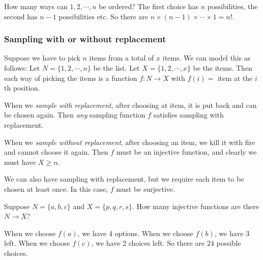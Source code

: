 \documentclass[a4paper]{article}
\begin{document}
\begin{eg}
  How many ways can $1, 2, \cdots, n$ be ordered? The first choice has $n$ possibilities, the second has $n - 1$ possibilities etc. So there are $n\times (n - 1)\times\cdots \times 1 = n!$.
\end{eg}

\subsubsection*{Sampling with or without replacement}
Suppose we have to pick $n$ items from a total of $x$ items. We can model this as follows: Let $N = \{1, 2, \cdots, n\}$ be the list. Let $X = \{1, 2, \cdots, x\}$ be the items. Then each way of picking the items is a function $f: N\to X$ with $f(i) =$ item at the $i$th position.

\begin{defi}
  When we \emph{sample with replacement}, after choosing at item, it is put back and can be chosen again. Then \emph{any} sampling function $f$ satisfies sampling with replacement.
\end{defi}

\begin{defi}
  When we \emph{sample without replacement}, after choosing an item, we kill it with fire and cannot choose it again. Then $f$ must be an injective function, and clearly we must have $X \geq n$.
\end{defi}

We can also have sampling with replacement, but we require each item to be chosen at least once. In this case, $f$ must be surjective.

\begin{eg}
  Suppose $N = \{a, b, c\}$ and $X = \{p, q, r, s\}$. How many injective functions are there $N\to X$?

  When we choose $f(a)$, we have 4 options. When we choose $f(b)$, we have 3 left. When we choose $f(c)$, we have 2 choices left. So there are $24$ possible choices.
\end{eg}
\end{document}
